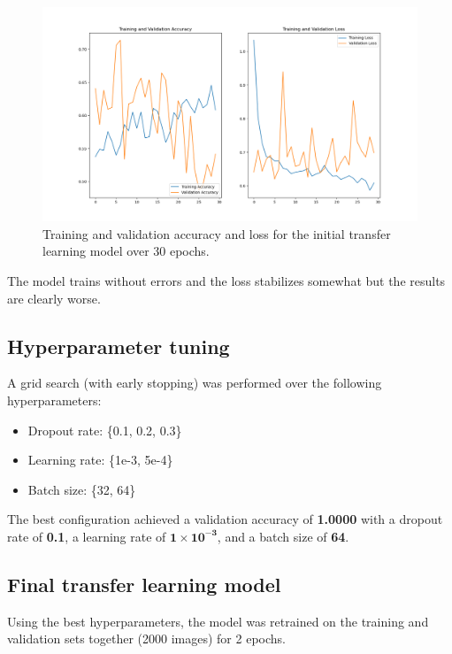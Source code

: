 \documentclass[conference]{IEEEtran}
\begin{document}
\begin{figure}[htbp]
	\centerline{\includegraphics[width=\linewidth]{Images/Transferlearning_1.png}}
	\caption{Training and validation accuracy and loss for the initial transfer learning model over 30 epochs.}
	\label{fig:transferlearning_1}
\end{figure}

The model trains without errors and the loss stabilizes somewhat but the results are clearly worse.

\subsection{Hyperparameter tuning}
A grid search (with early stopping) was performed over the following hyperparameters:

\begin{itemize}
	\item Dropout rate: \{0.1, 0.2, 0.3\}
	\item Learning rate: \{1e-3, 5e-4\}
	\item Batch size: \{32, 64\}
\end{itemize}
\vspace{0.5cm}

The best configuration achieved a validation accuracy of \textbf{1.0000} with a dropout rate of \textbf{0.1}, a learning rate of \(\mathbf{1\times10^{-3}}\), and a batch size of \textbf{64}.

\subsection{Final transfer learning model}
Using the best hyperparameters, the model was retrained on the training and validation sets together (2000 images) for 2 epochs.
\end{document}

